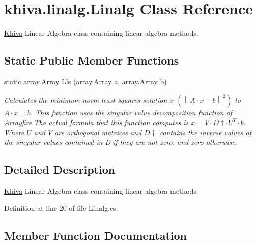 \hypertarget{classkhiva_1_1linalg_1_1_linalg}{}\section{khiva.\+linalg.\+Linalg Class Reference}
\label{classkhiva_1_1linalg_1_1_linalg}


\mbox{\hyperlink{classkhiva_1_1_khiva}{Khiva}} Linear Algebra class containing linear algebra methods.  


\subsection*{Static Public Member Functions}
\begin{DoxyCompactItemize}
\item 
static \mbox{\hyperlink{classkhiva_1_1array_1_1_array}{array.\+Array}} \mbox{\hyperlink{classkhiva_1_1linalg_1_1_linalg_a5755536b7444370e2014430f5fb81140}{Lls}} (\mbox{\hyperlink{classkhiva_1_1array_1_1_array}{array.\+Array}} a, \mbox{\hyperlink{classkhiva_1_1array_1_1_array}{array.\+Array}} b)
\begin{DoxyCompactList}\small\item\em Calculates the minimum norm least squares solution $x$ $(\left\lVert{A·x - b}\right\rVert^2)$ to $A·x = b$. This function uses the singular value decomposition function of Arrayfire.\+The actual formula that this function computes is $x = V·D\dagger·U^T·b$. Where $U$ and $V$ are orthogonal matrices and $D\dagger$ contains the inverse values of the singular values contained in D if they are not zero, and zero otherwise. \end{DoxyCompactList}\end{DoxyCompactItemize}


\subsection{Detailed Description}
\mbox{\hyperlink{classkhiva_1_1_khiva}{Khiva}} Linear Algebra class containing linear algebra methods. 



Definition at line 20 of file Linalg.\+cs.



\subsection{Member Function Documentation}
\mbox{\label{classkhiva_1_1linalg_1_1_linalg_a5755536b7444370e2014430f5fb81140}} 
